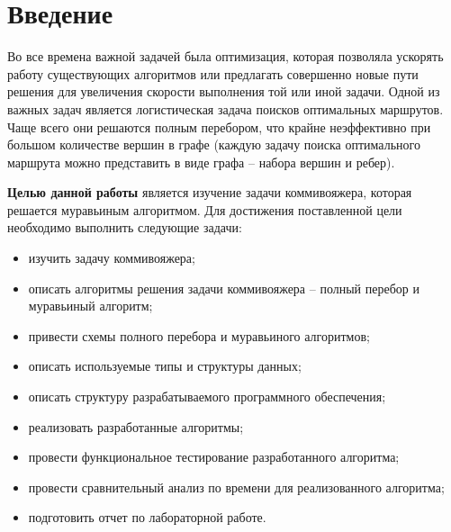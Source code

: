 \chapter*{Введение}

Во все времена важной задачей была оптимизация, которая позволяла ускорять работу существующих алгоритмов или предлагать совершенно новые пути решения для увеличения скорости выполнения той или иной задачи. Одной из важных задач является логистическая задача поисков оптимальных маршрутов. Чаще всего они решаются полным перебором, что крайне неэффективно при большом количестве вершин в графе (каждую задачу поиска оптимального маршрута можно представить в виде графа -- набора вершин и ребер).


\textbf{Целью данной работы} является изучение задачи коммивояжера, которая решается муравьиным алгоритмом. 
Для достижения поставленной цели необходимо выполнить следующие задачи:
\begin{itemize}
	\item изучить задачу коммивояжера;
    \item описать алгоритмы решения задачи коммивояжера -- полный перебор и муравьиный алгоритм;
    \item привести схемы полного перебора и муравьиного алгоритмов;
    \item описать используемые типы и структуры данных;
    \item описать структуру разрабатываемого программного обеспечения;
    \item реализовать разработанные алгоритмы;
    \item провести функциональное тестирование разработанного алгоритма;
    \item провести сравнительный анализ по времени для реализованного алгоритма;
    \item подготовить отчет по лабораторной работе.
\end{itemize}
